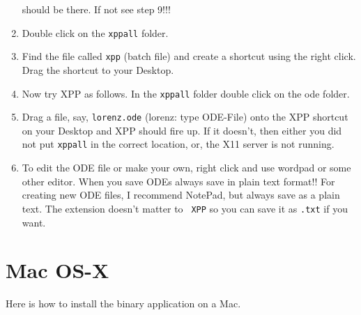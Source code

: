 \documentclass{article}
\begin{document}
\begin{enumerate}
should be there. If not see step 9!!!
\item Double click on the {\tt xppall} folder. 
\item Find the file called {\tt xpp} (batch file) and create a
shortcut using the right click. Drag the shortcut to your Desktop.
\item Now try XPP as follows.  In the {\tt xppall} folder double click
on the ode folder.
\item  Drag a file, say, {\tt lorenz.ode}  (lorenz: type ODE-File)
onto the XPP shortcut on your Desktop and XPP should fire up. If it
doesn't, then either you did not put {\tt xppall} in the correct
location, or, the X11 server is not running. 
\item To edit the ODE file or make your own, right click and use
wordpad or some other editor. When you save ODEs always save in plain
text format!! For creating new ODE files, I recommend NotePad, but
always save as a plain text.  The extension doesn't matter to {\tt
XPP} so you can save it as {\tt .txt} if you want.
\end{enumerate}


\section{Mac OS-X}
Here is how to install the binary application on a Mac.
\end{document}
